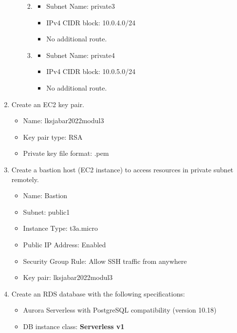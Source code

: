 \documentclass{article}
\begin{document}
\begin{enumerate}
\begin{itemize}
\begin{enumerate}
\begin{itemize}
      \end{itemize}
      \vspace{5mm} 
      \item 
      \begin{itemize}
        \item Subnet Name: private3
        \item IPv4 CIDR block: 10.0.4.0/24
        \item No additional route.
      \end{itemize}
      \vspace{5mm} 
      \item 
      \begin{itemize}
        \item Subnet Name: private4
        \item IPv4 CIDR block: 10.0.5.0/24
        \item No additional route.
      \end{itemize}
    \end{enumerate}
  \end{itemize}
  \item Create an EC2 key pair.
  \begin{itemize}
    \item Name: lksjabar2022modul3
    \item Key pair type: RSA
    \item Private key file format: .pem
  \end{itemize}
  \item Create a bastion host (EC2 instance) to access resources in private subnet remotely.
    \begin{itemize}
      \item Name: Bastion
      \item Subnet: public1
      \item Instance Type: t3a.micro
      \item Public IP Address: Enabled
      \item Security Group Rule: Allow SSH traffic from anywhere
      \item Key pair: lksjabar2022modul3
    \end{itemize}
  \item Create an RDS database with the following specifications:
  \begin{itemize}
    \item Aurora Serverless with PostgreSQL compatibility (version 10.18)
    \item DB instance class: \textbf{Serverless v1}

\end{itemize}
\end{enumerate}
\end{document}

